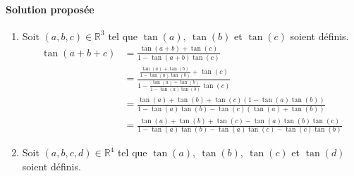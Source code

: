 \documentclass[14pt]{article}
\def\R{\mathbb R}
\begin{document}
    \paragraph{Solution proposée} 
    \begin{enumerate}
        \item Soit $(a,b,c)\in\R^3$ tel que $\tan(a),\ \tan(b)$ et $\tan(c)$ soient définis.\\

        \begin{align*}
            \tan(a+b+c) &=\frac{\tan(a+b)+\tan(c)}{1-\tan(a+b)\tan(c)}\\
                        &=\frac{\frac{\tan(a)+\tan(b)}{1-\tan(a)\tan(b)}+\tan(c)}{1-\frac{\tan(a)+\tan(b)}{1-\tan(a)\tan(b)}\tan(c)}\\
                        &=\frac{\tan(a)+\tan(b)+\tan(c)(1-\tan(a)\tan(b))}{1-\tan(a)\tan(b)-\tan(c)(\tan(a)+\tan(b))}\\
                        &=\frac{\tan(a)+\tan(b)+\tan(c)-\tan(a)\tan(b)\tan(c)}{1-\tan(a)\tan(b)-\tan(a)\tan(c)-\tan(c)\tan(b)}
        \end{align*}

        \item Soit $(a,b,c,d)\in\R^4$ tel que $\tan(a),\ \tan(b),\ \tan(c)$ et $\tan(d)$ soient définis.\\


\end{enumerate}
\end{document}
